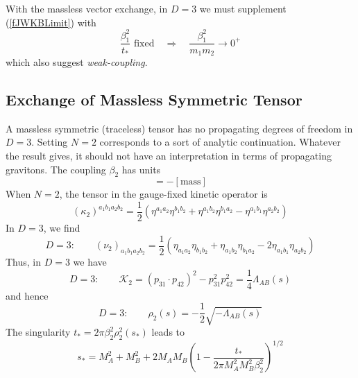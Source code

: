 With the massless vector exchange, in $D = 3$ we must supplement (\ref{fJWKBLimit}) with
\begin{equation}
	\frac{\beta_{1}^{2}}{t_{*}} \text{ fixed} \quad \Longrightarrow \quad \frac{\beta_{1}^{2}}{m_{1} m_{2}} \rightarrow 0^{+}
\end{equation}
which also suggest \textit{weak-coupling}.
\subsection{Exchange of Massless Symmetric Tensor}
A massless symmetric (traceless) tensor has no propagating degrees of freedom in $D = 3$. Setting $N = 2$ corresponds to a sort of analytic continuation. Whatever the result gives, it should not have an interpretation in terms of propagating gravitons. The coupling $\beta_{2}$ has units
\begin{equation}
	[\beta_{2}] = - [\text{mass}]
\end{equation}
When $N = 2$, the tensor in the gauge-fixed kinetic operator is
\begin{equation}
	(\kappa_{2})^{a_{1}b_{1} a_{2} b_{2}} = \frac{1}{2} \left( \eta^{a_{1} a_{2}} \eta^{b_{1} b_{2}} + \eta^{a_{1}b_{2}} \eta^{b_{1}a_{2}} - \eta^{a_{1}b_{1}} \eta^{a_{2}b_{2}} \right)
\end{equation}
In $D = 3$, we find
\begin{equation}
	D = 3: \qquad (\nu_{2})_{a_{1}b_{1} a_{2} b_{2}} = \frac{1}{2} \left( \eta_{a_{1} a_{2}} \eta_{b_{1} b_{2}} + \eta_{a_{1}b_{2}} \eta_{b_{1}a_{2}} - 2\eta_{a_{1}b_{1}} \eta_{a_{2}b_{2}} \right)
\end{equation}
Thus, in $D = 3$ we have
\begin{equation}
	D = 3: \qquad \mathcal{K}_{2} = (p_{31} \cdot p_{42})^{2} - p_{31}^{2} p_{42}^{2} = \frac{1}{4} \Lambda_{AB}(s) \label{D3K2}
\end{equation}
and hence
\begin{equation}
	D = 3: \qquad \rho_{2}(s) = -\frac{1}{2} \sqrt{-\Lambda_{AB}(s)} \label{D3rho2}
\end{equation}
The singularity $t_{*} = 2 \pi \beta_{2}^{2} \rho_{2}^{2}(s_{*})$ leads to
\begin{equation}
	s_{*} = M_{A}^{2} + M_{B}^{2} + 2 M_{A} M_{B} \left( 1 - \frac{t_{*}}{2\pi M_{A}^{2} M_{B}^{2} \beta_{2}^{2}} \right)^{1/2} \label{3s2}
\end{equation}
